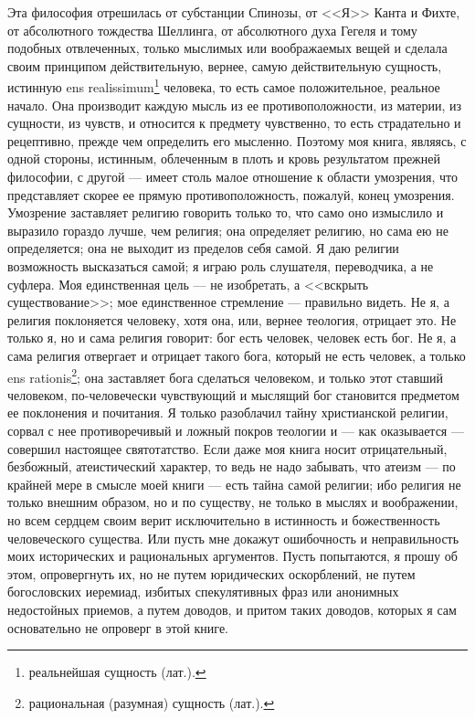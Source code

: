 \documentclass[12pt,oneside]{book}
\begin{document}
Эта философия отрешилась от субстанции Спинозы, от <<Я>> Канта и Фихте, от абсолютного тождества Шеллинга, от абсолютного духа Гегеля и тому подобных отвлеченных, только мыслимых или воображаемых вещей и сделала своим принципом действительную, вернее, самую действительную сущность, истинную ens realissimum\footnote{реальнейшая сущность (лат.).} человека, то есть самое положительное, реальное начало. Она производит каждую мысль из ее противоположности, из материи, из сущности, из чувств, и относится к предмету чувственно, то есть страдательно и рецептивно, прежде чем определить его мысленно. Поэтому моя книга, являясь, с одной стороны, истинным, облеченным в плоть и кровь результатом прежней философии, с другой --- имеет столь малое отношение к области умозрения, что представляет скорее ее прямую противоположность, пожалуй, конец умозрения. Умозрение заставляет религию говорить только то, что само оно измыслило и выразило гораздо лучше, чем религия; она определяет религию, но сама ею не определяется; она не выходит из пределов себя самой. Я даю религии возможность высказаться самой; я играю роль слушателя, переводчика, а не суфлера. Моя единственная цель --- не изобретать, а <<вскрыть существование>>; мое единственное стремление --- правильно видеть. Не я, а религия поклоняется человеку, хотя она, или, вернее теология, отрицает это. Не только я, но и сама религия говорит: бог есть человек, человек есть бог. Не я, а сама религия отвергает и отрицает такого бога, который не есть человек, а только ens rationis\footnote{рациональная (разумная) сущность (лат.).}; она заставляет бога сделаться человеком, и только этот ставший человеком, по-человечески чувствующий и мыслящий бог становится предметом ее поклонения и почитания. Я только разоблачил тайну христианской религии, сорвал с нее противоречивый и ложный покров теологии и --- как оказывается --- совершил настоящее святотатство. Если даже моя книга носит отрицательный, безбожный, атеистический характер, то ведь не надо забывать, что атеизм --- по крайней мере в смысле моей книги --- есть тайна самой религии; ибо религия не только внешним образом, но и по существу, не только в мыслях и воображении, но всем сердцем своим верит исключительно в истинность и божественность человеческого существа. Или пусть мне докажут ошибочность и неправильность моих исторических и рациональных аргументов. Пусть попытаются, я прошу об этом, опровергнуть их, но не путем юридических оскорблений, не путем богословских иеремиад, избитых спекулятивных фраз или анонимных недостойных приемов, а путем доводов, и притом таких доводов, которых я сам основательно не опроверг в этой книге.
\end{document}
